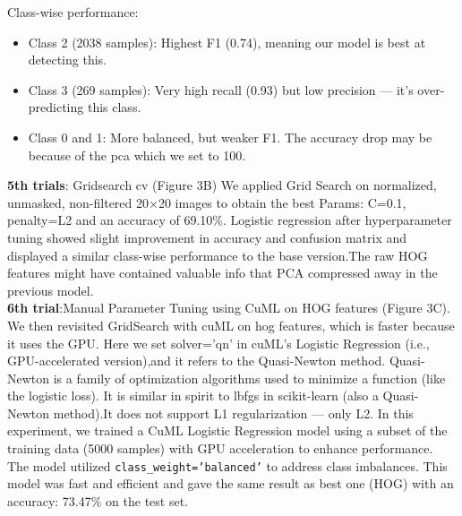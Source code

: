 \documentclass{article}
\begin{document}
Class-wise performance: 
\begin{itemize}
    \item Class 2 (2038 samples): Highest F1 (0.74), meaning our model is best at detecting this.
    \item Class 3 (269 samples): Very high recall (0.93) but low precision — it’s over-predicting this class.
    \item Class 0 and 1: More balanced, but weaker F1.
The accuracy drop may be because of the pca which we set to 100.
\end{itemize}

\textbf{5th trials}: Gridsearch cv (Figure 3B)
We applied Grid Search on normalized, unmasked, non-filtered 20×20 images to obtain the best Params: C=0.1, penalty=L2 and an accuracy of 69.10\%.
Logistic regression after hyperparameter tuning showed slight improvement in accuracy and confusion matrix and displayed a	similar class-wise performance to the base version.The raw HOG features might have contained valuable info that PCA compressed away in the previous model.
\\
\textbf{6th trial}:Manual Parameter Tuning using CuML on HOG features (Figure 3C).
We then revisited GridSearch with cuML on hog features, which is faster because it uses the GPU.
Here we set solver='qn' in cuML's Logistic Regression (i.e., GPU-accelerated version),and it refers to the Quasi-Newton method.
Quasi-Newton is a family of optimization algorithms used to minimize a function (like the logistic loss).
It is similar in spirit to lbfgs in scikit-learn (also a Quasi-Newton method).It does not support L1 regularization — only L2.
In this experiment, we trained a CuML Logistic Regression model using a subset of the training data (5000 samples) with GPU acceleration to enhance performance. The model utilized \texttt{class\_weight='balanced'} to address class imbalances. This model was fast and efficient and gave the same result as best one (HOG) with an accuracy: 73.47\% on the test set.
\end{document}
